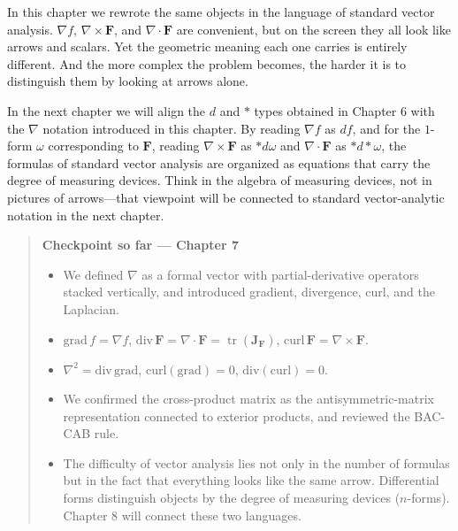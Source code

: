 In this chapter we rewrote the same objects in the language of standard
vector analysis. \(\nabla f\), \(\nabla\times\mathbf F\), and
\(\nabla\cdot\mathbf F\) are convenient, but on the screen they all look
like arrows and scalars. Yet the geometric meaning each one carries is
entirely different. And the more complex the problem becomes, the harder
it is to distinguish them by looking at arrows alone.

In the next chapter we will align the \(d\) and \(\ast\) types obtained
in Chapter 6 with the \(\nabla\) notation introduced in this chapter. By
reading \(\nabla f\) as \(df\), and for the \(1\)-form \(\omega\)
corresponding to \(\mathbf F\), reading \(\nabla\times\mathbf F\) as
\(\ast d\omega\) and \(\nabla\cdot\mathbf F\) as \(\ast d\ast\omega\),
the formulas of standard vector analysis are organized as equations that
carry the degree of measuring devices. Think in the algebra of measuring
devices, not in pictures of arrows---that viewpoint will be connected to
standard vector-analytic notation in the next chapter.

\begin{quote}
\textbf{Checkpoint so far — Chapter 7}

\begin{itemize}
\item
  We defined \(\nabla\) as a formal vector with partial-derivative
  operators stacked vertically, and introduced gradient, divergence,
  curl, and the Laplacian.
\item
  \(\mathrm{grad}\,f = \nabla f\),
  \(\mathrm{div}\,\mathbf{F} = \nabla \cdot \mathbf{F} = \operatorname{tr}(\mathbf{J}_\mathbf{F})\),
  \(\mathrm{curl}\,\mathbf{F} = \nabla \times \mathbf{F}\).
\item
  \(\nabla^2 = \mathrm{div}\,\mathrm{grad}\),
  \(\mathrm{curl}(\mathrm{grad}) = 0\),
  \(\mathrm{div}(\mathrm{curl}) = 0\).
\item
  We confirmed the cross-product matrix as the antisymmetric-matrix
  representation connected to exterior products, and reviewed the
  BAC-CAB rule.
\item
  The difficulty of vector analysis lies not only in the number of
  formulas but in the fact that everything looks like the same arrow.
  Differential forms distinguish objects by the degree of measuring
  devices (\(n\)-forms). Chapter 8 will connect these two languages.
\end{itemize}
\end{quote}

\newpage

